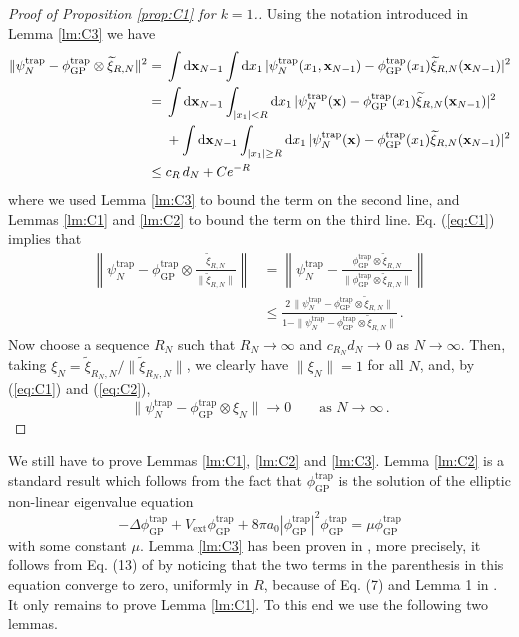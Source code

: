 \documentclass[11pt]{article}
\newcommand{\rd}{{\rm d}}
\newcommand{\Vtrap}{V_{\text{ext}}}
\newcommand{\psitrap}{\psi_N^{\text{trap}}}
\newcommand{\phitrap}{\phi_{\text{GP}}^{\text{trap}}}
\newcommand{\bx}{{\bf x}}
\newcommand{\wt}{\widetilde}
\begin{document}
\begin{proof}[Proof of Proposition \ref{prop:C1} for $k=1$.]
 Using the notation
introduced in Lemma \ref{lm:C3} we have
\begin{equation}\label{eq:C1}
\begin{split}
\| \psitrap - \phitrap \otimes \wt \xi_{R,N} \|^2 = \; &\int \rd
\bx_{N-1} \int \rd x_1 \, |\psitrap (x_1, \bx_{N-1}) - \phitrap
(x_1) \wt \xi_{R,N} (\bx_{N-1}) |^2 \\ = \; & \int \rd \bx_{N-1}
\int_{|x_1| < R} \rd x_1 \, |\psitrap (\bx) - \phitrap (x_1) \wt
\xi_{R,N} (\bx_{N-1}) |^2 \\ & + \int \rd \bx_{N-1} \int_{|x_1| \geq
R} \rd x_1 \, |\psitrap (\bx) - \phitrap (x_1) \wt \xi_{R,N}
(\bx_{N-1}) |^2 \\  \leq \; & c_R \, d_N + C e^{-R}
\end{split}
\end{equation}
where we used Lemma \ref{lm:C3} to bound the term on the second
line, and Lemmas \ref{lm:C1} and \ref{lm:C2} to bound the term on
the third line. Eq. (\ref{eq:C1}) implies that
\begin{equation}\label{eq:C2}
\begin{split}
\left\| \psitrap - \phitrap \otimes \frac{ \wt \xi_{R,N}}{\| \wt
\xi_{R,N} \|} \right\| &= \left\| \psitrap - \frac{ \phitrap \otimes
\wt \xi_{R,N}}{\| \phitrap \otimes \wt \xi_{R,N} \|} \right\|
\\ &\leq \frac{2\, \| \psitrap - \phitrap \otimes \wt \xi_{R,N} \|}{1-\|
\psitrap - \phitrap \otimes \wt \xi_{R,N} \|}\,.
\end{split}
\end{equation}
Now choose a sequence $R_N$ such that $R_N \to \infty$ and $c_{R_N}
d_N \to 0$ as $N \to\infty$. Then, taking $\xi_N = \wt \xi_{R_N,N} /
\| \wt \xi_{R_N,N} \|$, we clearly have $\| \xi_N \| =1$ for all
$N$, and, by (\ref{eq:C1}) and (\ref{eq:C2}),
\[ \| \psitrap - \phitrap \otimes \xi_N \| \to 0 \qquad \text{as } N
\to \infty \,.\]
\end{proof}

We still have to prove Lemmas \ref{lm:C1}, \ref{lm:C2}  and
\ref{lm:C3}. Lemma \ref{lm:C2} is a standard result which follows
from the fact that $\phitrap$ is the solution of the
elliptic non-linear eigenvalue equation
\begin{equation}
-\Delta \phitrap + \Vtrap \phitrap + 8 \pi a_0 |\phitrap|^2 \phitrap
= \mu \phitrap
\end{equation}
with some constant $\mu$.
Lemma \ref{lm:C3} has been proven in \cite{LS}, more precisely,
it follows from  Eq. (13) of \cite{LS} by noticing that
the two terms in the parenthesis in
this equation converge to zero, uniformly in $R$, because of Eq.
(7) and Lemma 1 in \cite{LS}.
It only remains to prove Lemma \ref{lm:C1}.
To this end we use
the following two lemmas.
\end{document}
